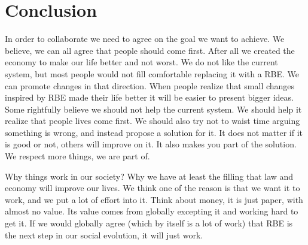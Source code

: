 \documentclass{article}
\begin{document}
\section{Conclusion}
\label{sec:conclusion}
In order to collaborate we need to agree on the goal we want to achieve.
We believe, we can all agree that people should come first.
After all we created the economy to make our life better and not worst.
We do not like the current system, but most people would not fill comfortable replacing it with a RBE.
We can promote changes in that direction.
When people realize that small changes inspired by RBE made their life better it will be easier to present bigger ideas.
Some rightfully believe we should not help the current system.
We should help it realize that people lives come first.
We should also try not to waist time arguing something is wrong, and instead propose a solution for it.
It does not matter if it is good or not, others will improve on it.
It also makes you part of the solution.
We respect more things, we are part of.

Why things work in our society?
Why we have at least the filling that law and economy will improve our lives.
We think one of the reason is that we want it to work, and we put a lot of effort into it.
Think about money, it is just paper, with almost no value.
Its value comes from globally excepting it and working hard to get it.
If we would globally agree (which by itself is a lot of work) that RBE is the next step  in our social evolution, it will just work.
\newpage


\end{document}

